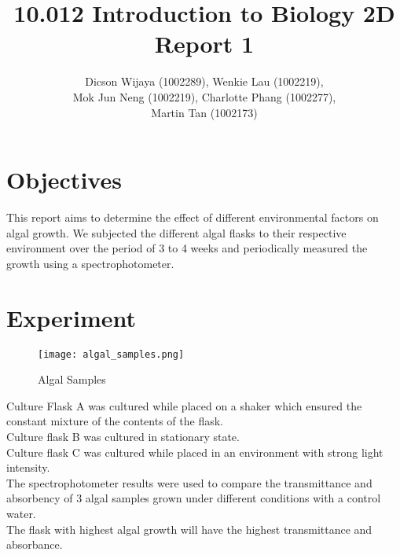 \documentclass[12pt,a4paper]{IEEEtran}
\author{Dicson Wijaya (1002289), Wenkie Lau (1002219), \\ Mok Jun Neng (1002219), Charlotte Phang (1002277), \\ Martin Tan (1002173)}
\title{10.012 Introduction to Biology 2D Report 1}
\begin{document}
	
	\maketitle
	
	\section{Objectives} \vspace{-0.5in}
	This report aims to determine the effect of different environmental factors on algal growth. We subjected the different algal flasks to their respective environment over the period of 3 to 4 weeks and periodically measured the growth using a spectrophotometer. \vspace{-0.7in}
	
	\section{Experiment} \vspace{-0.8in}
	\begin{figure}[H]
		\begin{center}
			\texttt{[image: algal\_samples.png]}
			\caption{Algal Samples}
			\label{fig:algalsamples}
		\end{center}
	\end{figure} \vspace{-0.4in}
    Culture Flask A was cultured while placed on a shaker which ensured the constant mixture of the contents of the flask. \\
    
    Culture flask B was cultured in stationary state. \\
    
    Culture flask C was cultured while placed in an environment with strong light intensity. \\
    
    The spectrophotometer results were used to compare the transmittance and absorbency of 3 algal samples grown under different conditions with a control water. \\
    
    The flask with highest algal growth will have the highest transmittance and absorbance.
    
\end{document}

